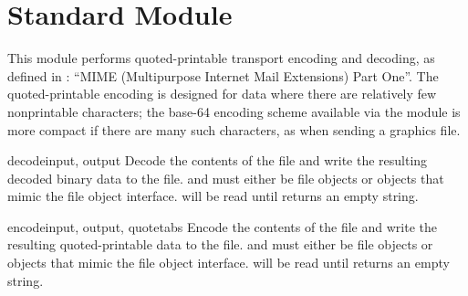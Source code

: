 \section{Standard Module }
\label{module-quopri}

This module performs quoted-printable transport encoding and decoding,
as defined in : ``MIME (Multipurpose Internet Mail Extensions)
Part One''.  The quoted-printable encoding is designed for data where
there are relatively few nonprintable characters; the base-64 encoding
scheme available via the  module is more compact if there
are many such characters, as when sending a graphics file.


\begin{funcdesc}{decode}{input, output}
Decode the contents of the  file and write the resulting
decoded binary data to the  file.
 and  must either be file objects or objects that
mimic the file object interface.  will be read until
 returns an empty string.
\end{funcdesc}

\begin{funcdesc}{encode}{input, output, quotetabs}
Encode the contents of the  file and write the resulting
quoted-printable data to the  file.
 and  must either be file objects or objects that
mimic the file object interface.  will be read until
 returns an empty string.
\end{funcdesc}



